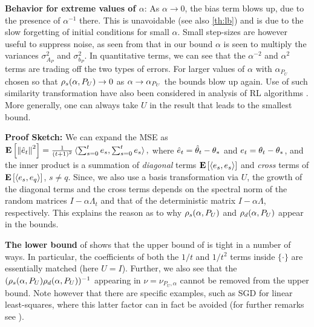 \textbf{Behavior for extreme values of $\alpha$}: As $\alpha\to 0$, the bias term blows up, due to the presence of $\alpha^{-1}$ there. This is unavoidable (see also \cref{th:lb}) and is due to the slow forgetting of initial conditions for small $\alpha$. Small step-sizes are however useful to suppress noise, as seen from that in our bound $\alpha$ is seen to multiply the variances $\sigma^2_{A_P}$ and $\sigma^2_{b_P}$. In quantitative terms, we can see that the $\alpha^{-2}$ and $\alpha^2$ terms are trading off the two types of errors. For larger values of $\alpha$ with $\alpha_{P_U}$ chosen so that $\rho_s(\alpha,P_U)\rightarrow 0$ as $\alpha\rightarrow \alpha_{P_U}$ the bounds blow up again. 
Use of such similarity transformation have also been considered in analysis of RL algorithms \cite{lihong}. More generally, one can always take $U$ in the result that leads to the smallest bound.

\textbf{Proof Sketch:} We can expand the MSE as $\mathbf{E}\left[\left\| \hat{e}_t\right\|^2\right]=\tfrac{1}{(t+1)^2}\, \langle \textstyle\sum_{s=0}^t e_s,\textstyle\sum_{s=0}^t e_s\rangle\,,$
where $\hat{e}_t = \hat{\theta}_t-\theta_*$ and $e_t = \theta_t-\theta_*$, and the inner product is a summation of \emph{diagonal} terms $\mathbf{E}\left[\langle e_s,e_s\rangle\right]$ and \emph{cross} terms of $\mathbf{E}\left[\langle e_s,e_q\rangle\right]$, $s\neq q$. Since, we also use a basis transformation via $U$, the growth of the diagonal terms and the cross terms depends on the spectral norm of the random matrices $I-\alpha \Lambda_t$ and that of the deterministic matrix $I-\alpha \Lambda$, respectively. This explains the reason as to why $\rho_s(\alpha,P_U)$ and $\rho_d(\alpha,P_U) $ appear in the bounds.

\textbf{The lower bound} of  shows that the upper bound of  is tight in a number of ways.
In particular, the coefficients of both the $1/t$ and $1/t^2$ terms inside $\{ \cdot \}$ are essentially matched (here $U=I$).
Further, we also see that the $(\rho_s(\alpha,P_U)\rho_d(\alpha,P_U))^{-1}$ appearing in $\nu = \nu_{P_U,\alpha}$ cannot be removed from the upper bound. 
Note however that there are specific examples, such as SGD for linear least-squares,
where this latter factor can in fact be avoided (for further remarks see ).


